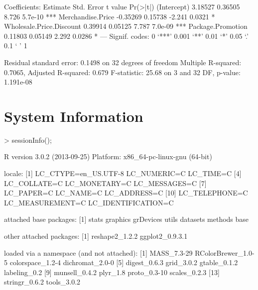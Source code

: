 \documentclass{article}
\begin{document}
\begin{enumerate}[a)]
\begin{Schunk}
\begin{Soutput}
Coefficients:
                         Estimate Std. Error t value Pr(>|t|)    
(Intercept)               3.18527    0.36505   8.726  5.7e-10 ***
Merchandise.Price        -0.35269    0.15738  -2.241   0.0321 *  
Wholesale.Price.Discount  0.39914    0.05125   7.787  7.0e-09 ***
Package.Promotion         0.11803    0.05149   2.292   0.0286 *  
---
Signif. codes:  0 ‘***’ 0.001 ‘**’ 0.01 ‘*’ 0.05 ‘.’ 0.1 ‘ ’ 1

Residual standard error: 0.1498 on 32 degrees of freedom
Multiple R-squared:  0.7065,	Adjusted R-squared:  0.679 
F-statistic: 25.68 on 3 and 32 DF,  p-value: 1.191e-08
\end{Soutput}
\end{Schunk}

\end{enumerate}


\section{System Information}

\begin{Schunk}
\begin{Sinput}
> sessionInfo();
\end{Sinput}
\begin{Soutput}
R version 3.0.2 (2013-09-25)
Platform: x86_64-pc-linux-gnu (64-bit)

locale:
 [1] LC_CTYPE=en_US.UTF-8 LC_NUMERIC=C         LC_TIME=C           
 [4] LC_COLLATE=C         LC_MONETARY=C        LC_MESSAGES=C       
 [7] LC_PAPER=C           LC_NAME=C            LC_ADDRESS=C        
[10] LC_TELEPHONE=C       LC_MEASUREMENT=C     LC_IDENTIFICATION=C 

attached base packages:
[1] stats     graphics  grDevices utils     datasets  methods   base     

other attached packages:
[1] reshape2_1.2.2  ggplot2_0.9.3.1

loaded via a namespace (and not attached):
 [1] MASS_7.3-29        RColorBrewer_1.0-5 colorspace_1.2-4   dichromat_2.0-0   
 [5] digest_0.6.3       grid_3.0.2         gtable_0.1.2       labeling_0.2      
 [9] munsell_0.4.2      plyr_1.8           proto_0.3-10       scales_0.2.3      
[13] stringr_0.6.2      tools_3.0.2       
\end{Soutput}
\end{Schunk}
\end{document}
